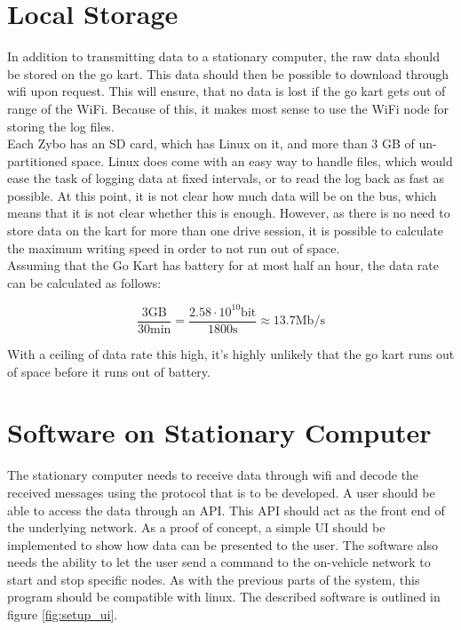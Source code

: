 
\section{Local Storage}
In addition to transmitting data to a stationary computer, the raw data should be stored on the go kart.
This data should then be possible to download through wifi upon request.
This will ensure, that no data is lost if the go kart gets out of range of the WiFi.
Because of this, it makes most sense to use the WiFi node for storing the log files.\\

Each Zybo has an SD card, which has Linux on it, and more than 3 GB of un-partitioned space. 
Linux does come with an easy way to handle files, which would ease the task of logging data at fixed intervals, or to read the log back as fast as possible.
At this point, it is not clear how much data will be on the bus, which means that it is not clear whether this is enough.
However, as there is no need to store data on the kart for more than one drive session, it is possible to calculate the maximum writing speed in order to not run out of space.\\

Assuming that the Go Kart has battery for at most half an hour, the data rate can be calculated as follows:

\begin{equation}
	\frac{3\mathrm{GB}}{30\si{\minute}} = \frac{2.58 \cdot 10^{10} \mathrm{bit}}{1800 \si{\second}} \approx 13.7 \mathrm{Mb/s}
\end{equation}

With a ceiling of data rate this high, it's highly unlikely that the go kart runs out of space before it runs out of battery.

\section{Software on Stationary Computer}
The stationary computer needs to receive data through wifi and decode the received messages using the protocol that is to be developed.
A user should be able to access the data through an API.
This API should act as the front end of the underlying network.
As a proof of concept, a simple UI should be implemented to show how data can be presented to the user.
The software also needs the ability to let the user send a command to the on-vehicle network to start and stop specific nodes.
As with the previous parts of the system, this program should be compatible with linux.
The described software is outlined in figure \ref{fig:setup_ui}.


